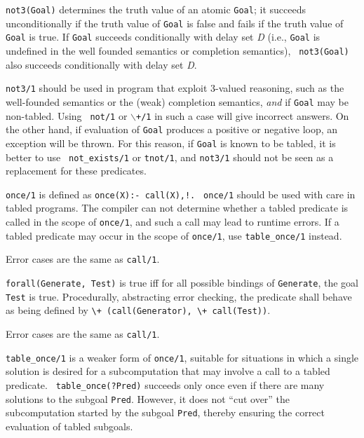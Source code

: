 \begin{description}
\begin{itemize}
% 
{\tt not3(Goal)} determines the truth value of an atomic {\tt Goal};
it succeeds unconditionally if the truth value of {\tt Goal} is false
and fails if the truth value of {\tt Goal} is true.  If {\tt Goal}
succeeds conditionally with delay set {\em D} (i.e., {\tt Goal} is
undefined in the well founded semantics or completion semantics), {\tt
  not3(Goal)} also succeeds conditionally with delay set {\em D}.

{\tt not3/1} should be used in program that exploit 3-valued
reasoning, such as the well-founded semantics or the (weak) completion
semantics, {\em and} if {\tt Goal} may be non-tabled.  Using {\tt
  not/1} or {\tt $\backslash$+/1} in such a case will give incorrect
answers.  On the other hand, if evaluation of {\tt Goal} produces a
positive or negative loop, an exception will be thrown.  For this
reason, if {\tt Goal} is known to be tabled, it is better to use {\tt
  not\_exists/1} or {\tt tnot/1}, and {\tt not3/1} should not be seen
as a replacement for these predicates.


%
    {\tt once/1} is defined as {\tt once(X):- call(X),!.}  {\tt
    once/1} should be used with care in tabled programs.  The compiler
    can not determine whether a tabled predicate is called in the
    scope of {\tt once/1}, and such a call may lead to runtime errors.
    If a tabled predicate may occur in the scope of {\tt once/1}, use
    {\tt table\_once/1} instead.

    Error cases are the same as {\tt call/1}.

%
{\tt forall(Generate, Test)} is true iff for all possible bindings of
{\tt Generate}, the goal {\tt Test} is true. Procedurally, abstracting
error checking, the predicate shall behave as being defined by 
\verb|\+ (call(Generator), \+ call(Test))|.

    Error cases are the same as {\tt call/1}.

    {\tt table\_once/1} is a weaker form of {\tt once/1}, suitable for
    situations in which a single solution is desired for a
    subcomputation that may involve a call to a tabled predicate.  {\tt
    table\_once(?Pred)} succeeds only once even if there are many
    solutions to the subgoal {\tt Pred}.  However, it does not ``cut
    over'' the subcomputation started by the subgoal {\tt Pred},
    thereby ensuring the correct evaluation of tabled subgoals.


\end{itemize}
\end{description}
